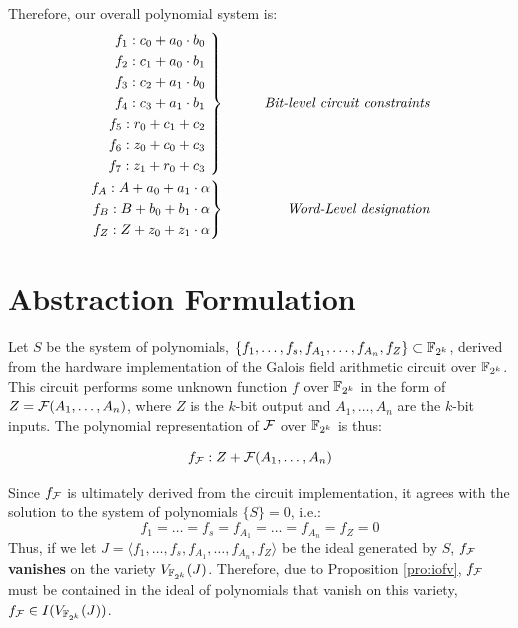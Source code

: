 \begin{Example}
Therefore, our overall polynomial system is:
\begin{eqnarray}
 \left .  \begin{aligned}
f_1: c_0+a_0 \cdot b_0  \\
f_2: c_1+a_0 \cdot b_1  \\
f_3: c_2+a_1 \cdot b_0  \\
f_4: c_3+a_1 \cdot b_1  \\
f_5: r_0+c_1 + c_2		\\
f_6: z_0+c_0 + c_3		\\
f_7: z_1+r_0 + c_3		   
 \end{aligned} 
\ \right\}
 &\qquad&  {\text {\it Bit-level circuit constraints}} \nonumber \\
 \left . \begin{aligned}
f_{A}: A+a_0+a_1\cdot \alpha  \\ 
f_{B}: B+b_0+b_1\cdot  \alpha  \\
f_{Z}: Z+z_0+z_1\cdot \alpha
 \end{aligned} 
\right\}
 &\qquad&  {\text {\it Word-Level designation}} \nonumber \\
\end{eqnarray}

\end{Example}

\section{Abstraction Formulation}

Let $S$ be the system of 
polynomials, 
$\{f_1,\dots,f_s,f_{A_1},\dots,f_{A_n},f_{Z}\}\subset {\mathbb{F}}_{2^k}$, 
derived from the hardware
implementation of the Galois field arithmetic circuit over ${\mathbb{F}}_{2^k}$.
This circuit performs some unknown function $f$ over 
${\mathbb{F}}_{2^k}$ in the form of $Z={\mathcal{F}}(A_1,\dots,A_n)$, where $Z$ is the $k$-bit 
output and $A_1,\dots,A_n$ are the $k$-bit inputs.
The polynomial representation of ${\mathcal{F}}$ over ${\mathbb{F}}_{2^k}$ is thus:

\begin{equation}
f_{{\mathcal{F}}}: Z+{\mathcal{F}}(A_1,\dots,A_n) \nonumber
\end{equation}

Since $f_{{\mathcal{F}}}$ is ultimately derived from the circuit implementation, 
it agrees with the solution to the system of polynomials $\{S\}=0$, i.e.:
\begin{equation}
f_1=\dots=f_s=f_{A_1}=\dots=f_{A_n}=f_{Z}=0 \nonumber
\end{equation}
Thus, if we let $J=\langle f_1,\dots,f_s,f_{A_1},\dots,f_{A_n},f_{Z}\rangle$ 
be the ideal generated by $S$, 
$f_{{\mathcal{F}}}$ {\bf vanishes} on the variety $V_{{\mathbb{F}}_{2^k}}(J)$. 
Therefore, due to Proposition \ref{pro:iofv}, 
$f_{{\mathcal{F}}}$ must be contained in the ideal of polynomials that vanish on
this variety, $f_{{\mathcal{F}}} \in I(V_{{\mathbb{F}}_{2^k}}(J))$. 

